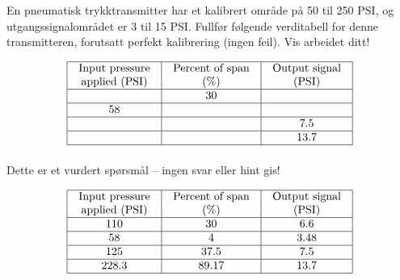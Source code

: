 

En pneumatisk trykktransmitter har et kalibrert område på 50 til 250 PSI, og utgangssignalområdet er 3 til 15 PSI.  Fullfør følgende verditabell for denne transmitteren, forutsatt perfekt kalibrering (ingen feil).  Vis arbeidet ditt!


$$\vbox{\offinterlineskip
\halign{\strut
\vrule \quad\hfil # \ \hfil & 
\vrule \quad\hfil # \ \hfil & 
\vrule \quad\hfil # \ \hfil \vrule \cr
\noalign{\hrule}
%
Input pressure & Percent of span & Output signal \cr
%
applied (PSI) & (\%) & (PSI) \cr
%
\noalign{\hrule}
%
 & 30 &  \cr
%
\noalign{\hrule}
%
58 &  &  \cr
%
\noalign{\hrule}
%
 &  & 7.5 \cr
%
\noalign{\hrule}
%
 &  & 13.7 \cr
%
\noalign{\hrule}
} %
}$$ %


\vfil 

\eject






Dette er et vurdert spørsmål -- ingen svar eller hint gis!








$$\vbox{\offinterlineskip
\halign{\strut
\vrule \quad\hfil # \ \hfil & 
\vrule \quad\hfil # \ \hfil & 
\vrule \quad\hfil # \ \hfil \vrule \cr
\noalign{\hrule}
%
Input pressure & Percent of span & Output signal \cr
%
applied (PSI) & (\%) & (PSI) \cr
%
\noalign{\hrule}
%
110 & 30 & 6.6 \cr
%
\noalign{\hrule}
%
58 & 4 & 3.48 \cr
%
\noalign{\hrule}
%
125 & 37.5 & 7.5 \cr
%
\noalign{\hrule}
%
228.3 & 89.17 & 13.7 \cr
%
\noalign{\hrule}
} %
}$$ %


